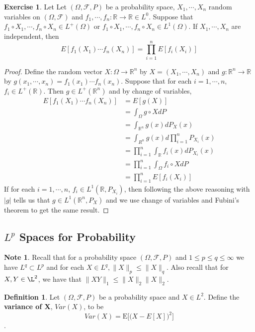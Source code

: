 \documentclass[12pt]{amsart}
\theoremstyle{definition}
\newtheorem{defn}[definition]{Definition}
\newtheorem{note}[definition]{Note}
\newtheorem{ex}[definition]{Exercise}
\newcommand{\Om}{\Omega}
\newcommand{\R}{\mathbb{R}}
\newcommand{\MF}{\mathcal{F}}
\newcommand{\E}{\text{E}}
\begin{document}
	\begin{ex}
		Let Let $(\Om, \MF, P)$ be a probability space, $X_1, \cdots, X_n$ random variables on $(\Om, \MF)$ and $f_1, \cdots, f_n: \R \rightarrow \R \in L^0$. Suppose that $f_1 \circ X_1, \cdots, f_n \circ X_n\in L^+(\Om)$ or $f_1 \circ X_1, \cdots, f_n \circ X_n \in L^1(\Om)$. If $X_1, \cdots, X_n$ are independent, then $$E[f_1(X_1) \cdots f_n(X_n)] = \prod_{i=1}^n E[f_i(X_i)]$$
	\end{ex}
	
	\begin{proof}
		Define the random vector $X : \Om \rightarrow \R^n$ by $X = (X_1, \cdots, X_n)$ and $g:\R^n \rightarrow \R$ by $g(x_1, \cdots, x_n) = f_1(x_1) \cdots f_n(x_n)$. Suppose that for each $i = 1, \cdots, n$, $f_i \in L^+(\R)$. Then $g \in L^+(\R^n)$ and by change of variables,  
		\begin{align*}
			E[f_1(X_1) \cdots f_n(X_n)] 
			&= E[g(X)] \\
			&= \int_{\Om} g \circ X dP \\
			&= \int_{\R^n} g(x) dP_X(x) \\
			&= \int_{R^n} g(x) d \prod\limits_{i=1}^nP_{X_i}(x) \\
			&=  \prod_{i=1}^n \int_{\R}f_i(x) d P_{X_i}(x) \\ 
			&= \prod_{i=1}^n \int_{\Om}f_i \circ X d P \\
			&= \prod_{i=1}^n E[f_i(X_i)]
		\end{align*}
		If for each $i = 1, \cdots, n$, $f_i \in L^1(\R, P_{X_i})$, then following the above reasoning with $\vert g \vert $ tells us that $g \in L^1(\R^n, P_X)$ and we use change of variables and Fubini's theorem to get the same result.  
	\end{proof}
	
	\subsection{$L^p$ Spaces for Probability}
	
	\begin{note}
		Recall that for a probability space $(\Om, \MF, P)$ and $1 \leq p \leq q \leq \infty$ we have $L^q \subset L^p$ and for each $X \in L^q, \|X \|_p \leq  \|X\|_q$. Also recall that for $X,Y \in \L^2$, we have that $\|XY \|_1 \leq \|X\|_2 \|X\|_2$.
	\end{note}
	
	\begin{defn}
		Let $(\Om, \MF, P)$ be a probability space and $X \in L^2$. Define the \textbf{variance of X}, $Var(X)$, to be $$Var(X) = \E\big[\big(X-E[X]\big)^2\big]$$.
	\end{defn}
	
\end{document}

